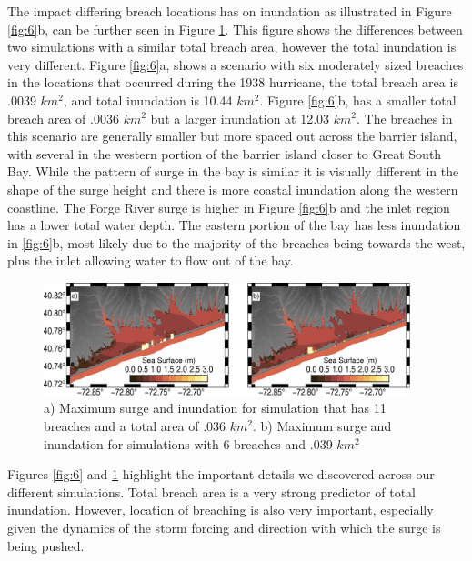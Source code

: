 \documentclass{coastal_paper}
\begin{document}
The impact differing breach locations has on inundation as illustrated in Figure \ref{fig:6}b, can be further seen in Figure \ref{fig:7}. This figure shows the differences between two simulations with a similar total breach area, however the total inundation is very different. Figure \ref{fig:6}a, shows a scenario with six moderately sized breaches in the locations that occurred during the 1938 hurricane, the total breach area is .0039 $km^2$, and total inundation is 10.44 $km^2$. Figure \ref{fig:6}b, has a smaller total breach area of .0036 $km^2$ but a larger inundation at 12.03 $km^2$. The breaches in this scenario are generally smaller but more spaced out across the barrier island, with several in the western portion of the barrier island closer to Great South Bay. While the pattern of surge in the bay is similar it is visually different in the shape of the surge height and there is more coastal inundation along the western coastline. The Forge River surge is higher in Figure \ref{fig:6}b and the inlet region has a lower total water depth. The eastern portion of the bay has less inundation in \ref{fig:6}b, most likely due to the majority of the breaches being towards the west, plus the inlet allowing water to flow out of the bay.


\begin{figure}
    \centering
    \includegraphics[width=0.95\textwidth]{figures/fig7_v2.pdf}
    \caption{a) Maximum surge and inundation for simulation that has 11 breaches and a total area of .036 $km^2$. b) Maximum surge and inundation for simulations with 6 breaches and .039 $km^2$}
    \label{fig:7}
\end{figure}


Figures \ref{fig:6} and \ref{fig:7} highlight the important details we discovered across our different simulations. Total breach area is a very strong predictor of total inundation. However, location of breaching is also very important, especially given the dynamics of the storm forcing and direction with which the surge is being pushed.
\end{document}
